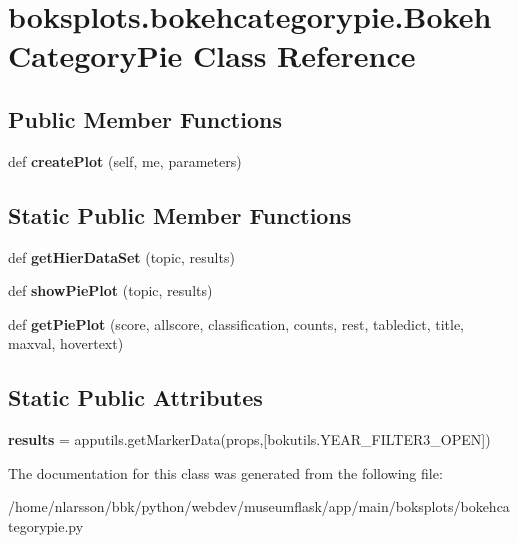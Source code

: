 \hypertarget{classboksplots_1_1bokehcategorypie_1_1BokehCategoryPie}{}\section{boksplots.\+bokehcategorypie.\+Bokeh\+Category\+Pie Class Reference}
\label{classboksplots_1_1bokehcategorypie_1_1BokehCategoryPie}
\subsection*{Public Member Functions}
\begin{DoxyCompactItemize}
\item 
\mbox{\label{classboksplots_1_1bokehcategorypie_1_1BokehCategoryPie_ab83bff716fcb1bee87d9b4acdef6687f}} 
def {\bfseries create\+Plot} (self, me, parameters)
\end{DoxyCompactItemize}
\subsection*{Static Public Member Functions}
\begin{DoxyCompactItemize}
\item 
\mbox{\label{classboksplots_1_1bokehcategorypie_1_1BokehCategoryPie_abfff2e749d0f93aaba030535b8df2599}} 
def {\bfseries get\+Hier\+Data\+Set} (topic, results)
\item 
\mbox{\label{classboksplots_1_1bokehcategorypie_1_1BokehCategoryPie_a28768353ddc1c22804e57ac65fa6cbd4}} 
def {\bfseries show\+Pie\+Plot} (topic, results)
\item 
\mbox{\label{classboksplots_1_1bokehcategorypie_1_1BokehCategoryPie_aa44c971e6f86edb47901846c7b0167a5}} 
def {\bfseries get\+Pie\+Plot} (score, allscore, classification, counts, rest, tabledict, title, maxval, hovertext)
\end{DoxyCompactItemize}
\subsection*{Static Public Attributes}
\begin{DoxyCompactItemize}
\item 
\mbox{\label{classboksplots_1_1bokehcategorypie_1_1BokehCategoryPie_a39f123c6d5316f3f3d603de7f4a56d64}} 
{\bfseries results} = apputils.\+get\+Marker\+Data(props,\mbox{[}bokutils.\+Y\+E\+A\+R\+\_\+\+F\+I\+L\+T\+E\+R3\+\_\+\+O\+P\+EN\mbox{]})
\end{DoxyCompactItemize}


The documentation for this class was generated from the following file\+:\begin{DoxyCompactItemize}
\item 
/home/nlarsson/bbk/python/webdev/museumflask/app/main/boksplots/bokehcategorypie.\+py\end{DoxyCompactItemize}
